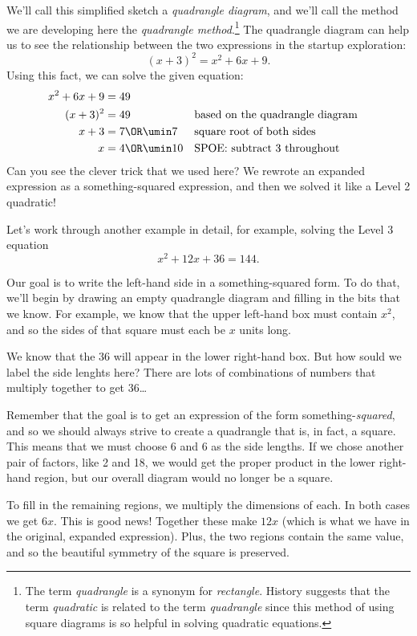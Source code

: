 We'll call this simplified sketch a \textit{quadrangle diagram}, and we'll call the method we are developing here the \textit{quadrangle method}.\footnote{The term \textit{quadrangle} is a synonym for \textit{rectangle}. History suggests that the term \textit{quadratic} is related to the term \textit{quadrangle} since this method of using square diagrams is so helpful in solving quadratic equations.} The quadrangle diagram can help us to see the relationship between the two expressions in the startup exploration:
\[(x+3)^2 = x^2 + 6x + 9.\]
Using this fact, we can solve the given equation:
\begin{align*}
x^2 + 6x + 9 &= 49
\\
(x+3)^2 &= 49
&&\text{based on the quadrangle diagram}
\\
x+3 &= 7 \OR \umin7
&&\text{square root of both sides}
\\
x &= 4 \OR \umin10
&&\text{SPOE: subtract 3 throughout}
\end{align*}
Can you see the clever trick that we used here? We rewrote an expanded expression as a something-squared expression, and then we solved it like a Level 2 quadratic!

Let's work through another example in detail, for example, solving the Level 3 equation
\[x^2 + 12x + 36 = 144.\]

Our goal is to write the left-hand side in a something-squared form. To do that, we'll begin by drawing an empty quadrangle diagram and filling in the bits that we know. For example, we know that the upper left-hand box must contain $x^2$, and so the sides of that square must each be $x$ units long.


We know that the 36 will appear in the lower right-hand box. But how sould we label the side lenghts here? There are lots of combinations of numbers that multiply together to get 36\ldots


Remember that the goal is to get an expression of the form something-\textit{squared}, and so we should always strive to create a quadrangle that is, in fact, a square. This means that we must choose 6 and 6 as the side lengths. If we chose another pair of factors, like 2 and 18, we would get the proper product in the lower right-hand region, but our overall diagram would no longer be a square.


To fill in the remaining regions, we multiply the dimensions of each. In both cases we get $6x$. This is good news! Together these make $12x$ (which is what we have in the original, expanded expression). Plus, the two regions contain the same value, and so the beautiful symmetry of the square is preserved.

